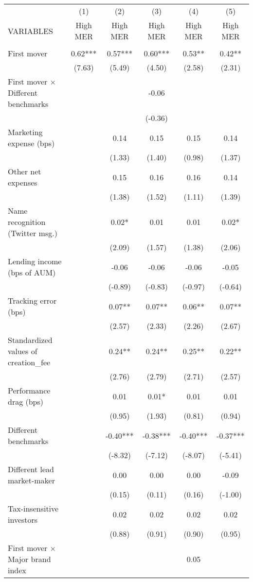 \documentclass[]{article}
\begin{document}
\begin{tabular}{lccccc} \hline
 & (1) & (2) & (3) & (4) & (5) \\
VARIABLES & High MER & High MER & High MER & High MER & High MER \\ \hline
 &  &  &  &  &  \\
First mover & 0.62*** & 0.57*** & 0.60*** & 0.53** & 0.42** \\
 & (7.63) & (5.49) & (4.50) & (2.58) & (2.31) \\
First mover $\times$ Different benchmarks &  &  & -0.06 &  &  \\
 &  &  & (-0.36) &  &  \\
Marketing expense (bps) &  & 0.14 & 0.15 & 0.15 & 0.14 \\
 &  & (1.33) & (1.40) & (0.98) & (1.37) \\
Other net expenses &  & 0.15 & 0.16 & 0.16 & 0.14 \\
 &  & (1.38) & (1.52) & (1.11) & (1.39) \\
Name recognition (Twitter msg.) &  & 0.02* & 0.01 & 0.01 & 0.02* \\
 &  & (2.09) & (1.57) & (1.38) & (2.06) \\
Lending income (bps of AUM) &  & -0.06 & -0.06 & -0.06 & -0.05 \\
 &  & (-0.89) & (-0.83) & (-0.97) & (-0.64) \\
Tracking error (bps) &  & 0.07** & 0.07** & 0.06** & 0.07** \\
 &  & (2.57) & (2.33) & (2.26) & (2.67) \\
Standardized values of creation\_fee &  & 0.24** & 0.24** & 0.25** & 0.22** \\
 &  & (2.76) & (2.79) & (2.71) & (2.57) \\
Performance drag (bps) &  & 0.01 & 0.01* & 0.01 & 0.01 \\
 &  & (0.95) & (1.93) & (0.81) & (0.94) \\
Different benchmarks &  & -0.40*** & -0.38*** & -0.40*** & -0.37*** \\
 &  & (-8.32) & (-7.12) & (-8.07) & (-5.41) \\
Different lead market-maker &  & 0.00 & 0.00 & 0.00 & -0.09 \\
 &  & (0.15) & (0.11) & (0.16) & (-1.00) \\
Tax-insensitive investors &  & 0.02 & 0.02 & 0.02 & 0.02 \\
 &  & (0.88) & (0.91) & (0.90) & (0.95) \\
First mover $\times$ Major brand index &  &  &  & 0.05 &  \\

\end{tabular}
\end{document}
